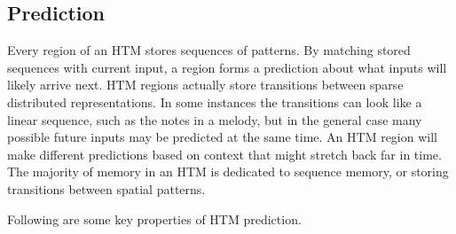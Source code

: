 \documentclass{report}
\begin{document}
\subsection*{Prediction}

Every region of an HTM stores sequences of patterns. By matching
stored sequences with current input, a region forms a prediction about
what inputs will likely arrive next. HTM regions actually store
transitions between sparse distributed representations. In some
instances the transitions can look like a linear sequence, such as the
notes in a melody, but in the general case many possible future inputs
may be predicted at the same time. An HTM region will make different
predictions based on context that might stretch back far in time. The
majority of memory in an HTM is dedicated to sequence memory, or
storing transitions between spatial patterns.

Following are some key properties of HTM prediction.
\end{document}
